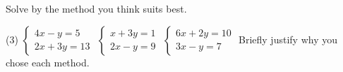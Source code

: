 Solve by the method you think suits best.
\begin{delar}(3)
  \task $\begin{cases} 4x - y = 5 \\ 2x + 3y = 13 \end{cases}$
  \task $\begin{cases} x + 3y = 1 \\ 2x - y = 9 \end{cases}$
  \task $\begin{cases} 6x + 2y = 10 \\ 3x - y = 7 \end{cases}$
  \task* Briefly justify why you chose each method.
\end{delar}
